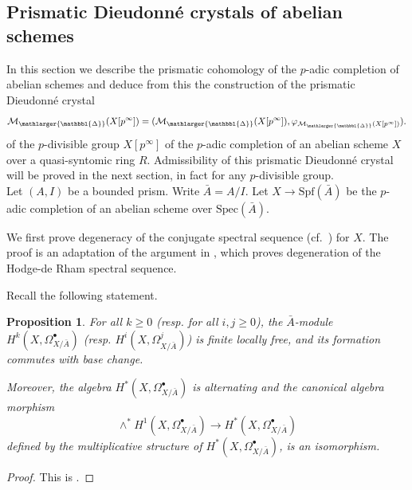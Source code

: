 \documentclass{amsart}
\newcommand{\prism}{{\mathlarger{\mathbbl{\Delta}}}}
\theoremstyle{plain}
\newtheorem{proposition}[theorem]{Proposition}
\theoremstyle{definition}
\newcommand{\Spec}{\mathrm{Spec}}
\newcommand{\Spf}{\mathrm{Spf}}
\newcommand{\purple}[1]{{\color{black} #1}}
\newcommand{\red}[1]{{\color{black} #1}}
\begin{document}
\subsection{Prismatic Dieudonn\'e crystals of abelian schemes}
\label{sec:prism-dieud-modul-dieud-mod-abel-schemes}

In this section we describe the prismatic cohomology of the $p$-adic completion of abelian schemes and deduce from this the construction of the prismatic Dieudonn\'e crystal \red{
$$
\mathcal{M}_{\prism}(X[p^\infty]) = (\mathcal{M}_{\prism}(X[p^{\infty}]), \varphi_{\mathcal{M}_{\prism}(X[p^{\infty}])}). 
$$}
of the $p$-divisible group $X[p^\infty]$ of the $p$-adic completion of an abelian scheme $X$ \purple{over a quasi-syntomic ring $R$}. \red{Admissibility of this prismatic Dieudonn\'e crystal will be proved in the next section, in fact for any $p$-divisible group.}
\\


Let $(A,I)$ be a bounded prism. \red{Write $\bar{A}=A/I$.} Let $X\to \Spf(\bar{A})$ be the $p$-adic completion of an abelian scheme over $\Spec(\bar{A})$.

We first prove degeneracy of the conjugate spectral sequence (cf.\ ) for $X$. The proof is an adaptation of the argument in \cite[Proposition 2.5.2]{berthelot_breen_messing_theorie_de_dieudonne_cristalline_II}, which proves degeneration of the Hodge-de Rham spectral sequence.


Recall the following statement. 
\begin{proposition}\label{sec:prism-cryst-abel-1-proposition-bbm-252}
For all $k\geq 0$ (resp. for all $i,j\geq 0$), the $\bar{A}$-module $H^k(X,\Omega_{X/\bar{A}}^{\bullet})$ (resp. $H^i(X,\Omega_{X/\bar{A}}^j)$) is finite locally free, and its formation commutes with base change.

Moreover, the algebra $H^*(X,\Omega_{X/\bar{A}}^{\bullet})$ is alternating and the canonical algebra morphism
\[ \wedge^* H^1(X,\Omega_{X/\bar{A}}^{\bullet}) \to H^*(X,\Omega_{X/\bar{A}}^{\bullet}) \]
defined by the multiplicative structure of $H^*(X,\Omega_{X/\bar{A}}^{\bullet})$, is an isomorphism.
\end{proposition}
\begin{proof}
This is \cite[Proposition 2.5.2. (i)-(ii)]{berthelot_breen_messing_theorie_de_dieudonne_cristalline_II}.
\end{proof}
\end{document}
